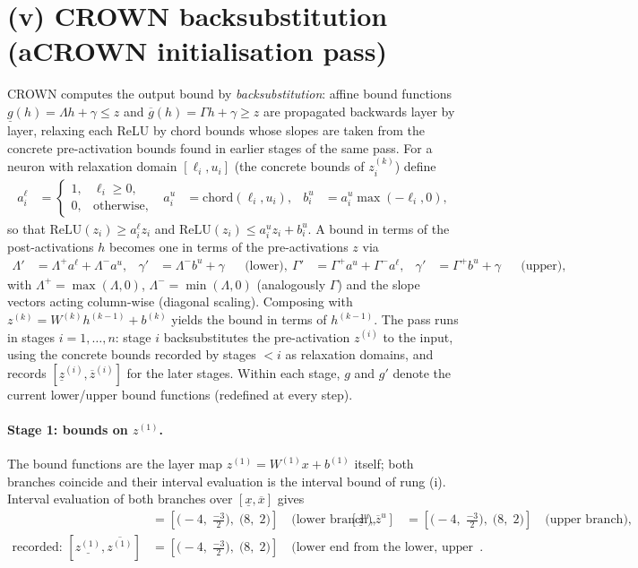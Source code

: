 \documentclass[11pt]{article}
\begin{document}
\section{(v) CROWN backsubstitution (aCROWN initialisation pass)}
CROWN computes the output bound by \emph{backsubstitution}: affine bound functions
$\underline{g}(h) = \Lambda h + \gamma \le z$ and $\overline{g}(h) = \Gamma h + \gamma \ge z$
are propagated backwards layer by layer, relaxing each ReLU by chord bounds whose slopes are taken
from the concrete pre-activation bounds found in earlier stages of the same pass. For a neuron with
relaxation domain $[\ell_i, u_i]$ (the concrete bounds of $z^{(k)}_i$) define
\begin{align*}
a^{\ell}_i &= \begin{cases} 1, & \ell_i \ge 0,\\ 0, & \text{otherwise}, \end{cases} & a^{u}_i &= \mathrm{chord}(\ell_i, u_i), & b^{u}_i &= a^{u}_i \max(-\ell_i, 0),
\end{align*}
so that $\mathrm{ReLU}(z_i) \ge a^{\ell}_i z_i$ and
$\mathrm{ReLU}(z_i) \le a^{u}_i z_i + b^{u}_i$. A bound in terms of the post-activations $h$ becomes
one in terms of the pre-activations $z$ via
\begin{align*}
\Lambda' &= \Lambda^{+} a^{\ell} + \Lambda^{-} a^{u}, & \gamma' &= \Lambda^{-} b^{u} + \gamma && \text{(lower)}, \
\Gamma' &= \Gamma^{+} a^{u} + \Gamma^{-} a^{\ell}, & \gamma' &= \Gamma^{+} b^{u} + \gamma && \text{(upper)},
\end{align*}
with $\Lambda^{+} = \max(\Lambda, 0)$, $\Lambda^{-} = \min(\Lambda, 0)$ (analogously $\Gamma$) and the
slope vectors acting column-wise (diagonal scaling). Composing with
$z^{(k)} = W^{(k)} h^{(k-1)} + b^{(k)}$ yields the bound in terms of $h^{(k-1)}$. The pass runs in
stages $i = 1, \dots, n$: stage $i$ backsubstitutes the pre-activation $z^{(i)}$ to the input, using
the concrete bounds recorded by stages $< i$ as relaxation domains, and records
$[\underline{z}^{(i)}, \overline{z}^{(i)}]$ for the later stages. Within each stage, $g$ and $g'$
denote the current lower/upper bound functions (redefined at every step).
\paragraph{Stage 1: bounds on $z^{(1)}$.}
The bound functions are the layer map $z^{(1)} = W^{(1)} x + b^{(1)}$ itself; both branches coincide and their interval evaluation is the interval bound of rung (i).
Interval evaluation of both branches over $[\underline{x}, \overline{x}]$ gives
\begin{align*}
[\underline{z}^{\ell}, \overline{z}^{\ell}] &= [\bigl(-4,\; \frac{-3}{2}\bigr),\; \bigl(8,\; 2\bigr)] \quad\text{(lower branch)}, & [\underline{z}^{u}, \overline{z}^{u}] &= [\bigl(-4,\; \frac{-3}{2}\bigr),\; \bigl(8,\; 2\bigr)] \quad\text{(upper branch)}, \\
\text{recorded: } [\underline{z^{(1)}}, \overline{z^{(1)}}] &= [\bigl(-4,\; \frac{-3}{2}\bigr),\; \bigl(8,\; 2\bigr)] \quad\text{(lower end from the lower, upper end from the upper branch)}.
\end{align*}
\end{document}

